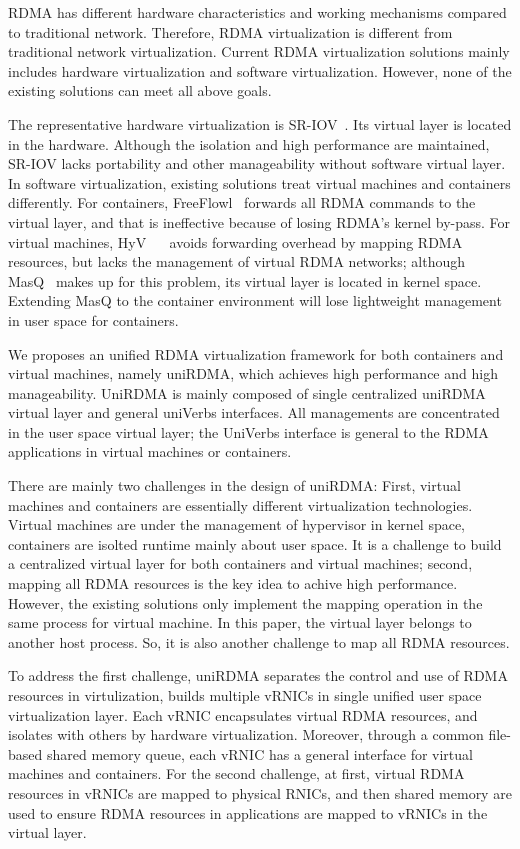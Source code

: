 RDMA has different hardware characteristics and working mechanisms compared to traditional network. Therefore, RDMA virtualization is different from traditional network virtualization. Current RDMA virtualization solutions mainly includes hardware virtualization and software virtualization. However, none of the existing solutions can meet all above goals.

The representative hardware virtualization is SR-IOV~\cite{sr-iov}. Its virtual layer is located in the hardware. Although the isolation and high performance are maintained,  SR-IOV lacks portability and other manageability without software virtual layer. In software virtualization, existing solutions treat virtual machines and containers differently. For containers, FreeFlowl~\cite{kim2019freeflow} forwards all RDMA commands to the virtual layer, and that is ineffective because of losing RDMA's kernel by-pass. For virtual machines, HyV~\cite{pfefferle2015hybrid} ~\cite{pfefferle2014vverbs} avoids forwarding overhead by mapping RDMA resources, but lacks the management of virtual RDMA networks; although MasQ~\cite{he2020masq} makes up for this problem, its virtual layer is located in kernel space. Extending MasQ to the container environment will lose lightweight  management in user space for containers.

We proposes an unified RDMA virtualization framework for both containers and virtual machines, namely uniRDMA, which achieves high performance and high manageability. UniRDMA is mainly composed of single centralized uniRDMA virtual layer and general uniVerbs interfaces. All managements are concentrated in the user space virtual layer; the UniVerbs interface is general to the RDMA applications in virtual machines or containers.

There are mainly two challenges in the design of uniRDMA: First, virtual machines and containers are essentially different virtualization technologies. Virtual machines are under the management of hypervisor in kernel space, containers are isolted runtime mainly about user space. It is a challenge to build a centralized virtual layer for both containers and virtual machines; second, mapping all RDMA resources is the key idea to achive high performance. However, the existing solutions only implement the mapping operation in the same process for virtual machine. In this paper, the virtual layer belongs to another host process. So, it is also another challenge to map all RDMA resources.

To address the first challenge, uniRDMA separates the control and use of RDMA resources in virtulization, builds multiple vRNICs in single unified user space virtualization layer. Each vRNIC encapsulates virtual RDMA resources, and isolates with others by hardware virtualization. Moreover, through a common file-based shared memory queue, each vRNIC has a general interface for virtual machines and containers. For the second challenge,  at first, virtual RDMA resources in vRNICs are mapped to physical RNICs, and then shared memory are used to ensure RDMA resources in applications are mapped to vRNICs in the virtual layer.


